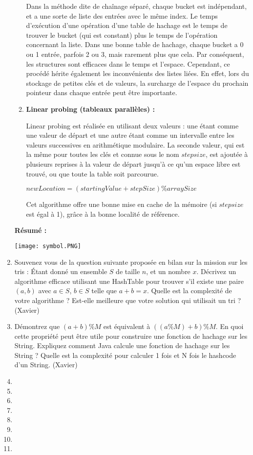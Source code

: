 \documentclass[11pt]{article}
\begin{document}
\begin{enumerate}
\begin{enumerate}
Dans la méthode dite de chaînage séparé, chaque bucket est indépendant, et a une sorte de liste des entrées avec le même index. Le temps d'exécution d'une opération d'une table de hachage est le temps de trouver le bucket (qui est constant) plus le temps de l'opération concernant la liste. Dans une bonne table de hachage, chaque bucket a 0 ou 1 entrée, parfois 2 ou 3, mais rarement plus que cela. Par conséquent, les structures sont efficaces dans le temps et l'espace. Cependant, ce procédé hérite également les inconvénients des listes liées. En effet, lors du stockage de petites clés et de valeurs, la surcharge de l'espace du prochain pointeur dans chaque entrée peut être importante. 

\item \textbf{Linear probing (tableaux parallèles) :}

Linear probing est réalisée en utilisant deux valeurs : une étant comme une valeur de départ et une autre étant comme un intervalle entre les valeurs successives en arithmétique modulaire. La seconde valeur, qui est la même pour toutes les clés et connue sous le nom $stepsize$, est ajoutée à plusieurs reprises à la valeur de départ jusqu'à ce qu'un espace libre est trouvé, ou que toute la table soit parcourue.
\begin{center}
$newLocation = (startingValue + stepSize) \% arraySize$
\end{center}
Cet algorithme offre une bonne mise en cache de la mémoire (si $stepsize$ est égal à 1), grâce à la bonne localité de référence.\\
\end{enumerate}
\textbf{Résumé :}
\begin{center}
\texttt{[image: symbol.PNG]}
\end{center}
\item Souvenez vous de la question suivante proposée en bilan sur la mission sur les
tris : Étant donné un ensemble $S$ de taille $n$, et un nombre $x$. Décrivez un algorithme
efficace utilisant une HashTable pour trouver s’il existe une paire $(a, b)$
avec $a \in S$, $b \in S$ telle que $a + b = x$. Quelle est la complexité de votre algorithme
? Est-elle meilleure que votre solution qui utilisait un tri ? (Xavier)
\item Démontrez que $(a + b)\%M$ est équivalent à $((a\%M) + b)\%M$. En quoi cette 
propriété peut être utile pour construire une fonction de hachage sur les String.
Expliquez comment Java calcule une fonction de hachage sur les String ? Quelle
est la complexité pour calculer 1 fois et N fois le hashcode d’un String. (Xavier)
\item
\item 
\item 
\item
\item 
\item 
\item
\item 


\end{enumerate}
\end{document}
